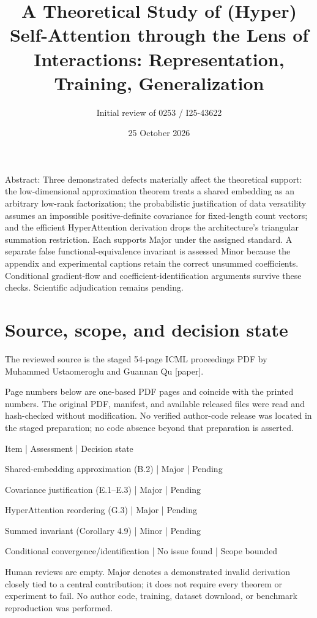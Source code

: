 \documentclass[10pt]{article}
\title{A Theoretical Study of (Hyper) Self-Attention through the Lens of Interactions: Representation, Training, Generalization}
\author{Initial review of 0253 / I25-43622}
\date{25 October 2026}
\begin{document}
\maketitle
Abstract: Three demonstrated defects materially affect the theoretical support: the low-dimensional approximation theorem treats a shared embedding as an arbitrary low-rank factorization; the probabilistic justification of data versatility assumes an impossible positive-definite covariance for fixed-length count vectors; and the efficient HyperAttention derivation drops the architecture’s triangular summation restriction. Each supports Major under the assigned standard. A separate false functional-equivalence invariant is assessed Minor because the appendix and experimental captions retain the correct unsummed coefficients. Conditional gradient-flow and coefficient-identification arguments survive these checks. Scientific adjudication remains pending.\par
\section*{Source, scope, and decision state}
The reviewed source is the staged 54-page ICML proceedings PDF by Muhammed Ustaomeroglu and Guannan Qu [paper].\par
Page numbers below are one-based PDF pages and coincide with the printed numbers. The original PDF, manifest, and available released files were read and hash-checked without modification. No verified author-code release was located in the staged preparation; no code absence beyond that preparation is asserted.\par
Item | Assessment | Decision state\par
Shared-embedding approximation (B.2) | Major | Pending\par
Covariance justification (E.1–E.3) | Major | Pending\par
HyperAttention reordering (G.3) | Major | Pending\par
Summed invariant (Corollary 4.9) | Minor | Pending\par
Conditional convergence/identification | No issue found | Scope bounded\par
Human reviews are empty. Major denotes a demonstrated invalid derivation closely tied to a central contribution; it does not require every theorem or experiment to fail. No author code, training, dataset download, or benchmark reproduction was performed.\par
\end{document}

